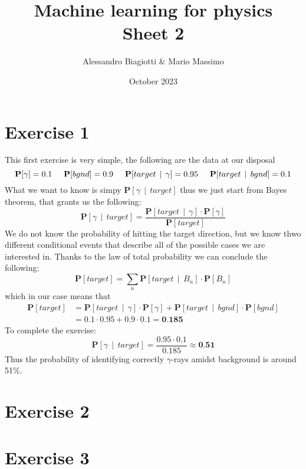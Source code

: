 \documentclass{article}
\title{Machine learning for physics \\ \large Sheet 2}
\author{Alessandro Biagiotti \& Mario Massimo}
\date{October 2023}
\newcommand{\spc}{\:\:}
\newcommand{\prob}[1]{\textbf{P}[#1]}
\newcommand{\cprob}[2]{\prob{#1 \spc | \spc #2}}
\begin{document}
\maketitle
\section{Exercise 1}
This first exercise is very simple, the following are the data at our disposal
\begin{equation*}
    \prob{\gamma} = 0.1 \hspace{0.5cm} 
    \prob{bgnd} = 0.9 \hspace{0.5cm}
    \cprob{target}{\gamma} = 0.95 \hspace{0.5cm}
    \cprob{target}{bgnd} = 0.1
\end{equation*}
What we want to know is simpy $\cprob{\gamma}{target}$ thus we just start from Bayes theorem, that grants us the following:
\begin{equation}
    \cprob{\gamma}{target} = \frac{\cprob{target}{\gamma} \cdot \prob{\gamma}}{\prob{target}}
\end{equation}
We do not know the probability of hitting the target direction, but we know thwo different conditional events that describe all of the possible cases we are interested in. Thanks to the law of total probability we can conclude the following:
\begin{equation}
    \prob{target} = \sum_n{\cprob{target}{B_n} \cdot \prob{B_n}}
\end{equation}
which in our case means that
\begin{align*}
    \prob{target} &= \cprob{target}{\gamma} \cdot \prob{\gamma} + \cprob{target}{bgnd} \cdot \prob{bgnd} \\
    &= 0.1 \cdot 0.95 + 0.9 \cdot 0.1 = \textbf{0.185}
\end{align*}
To complete the exercise:
\begin{equation*}
    \cprob{\gamma}{target} = \frac{0.95 \cdot 0.1}{0.185} \approx \textbf{0.51}
\end{equation*}
Thus the probability of identifying correctly $\gamma$-rays amidst background is around 51\%.
\pagebreak
\section{Exercise 2}
\pagebreak
\section{Exercise 3}
\end{document}
